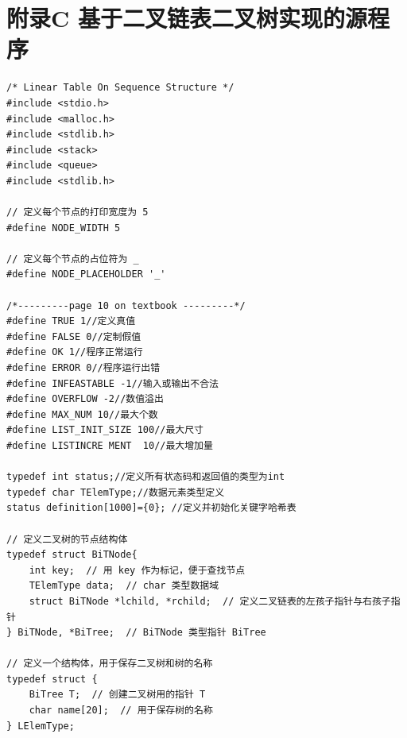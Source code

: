\documentclass[supercite]{Experimental_Report}
\theoremstyle{definition}
\begin{document}
\section{附录C 基于二叉链表二叉树实现的源程序}
\begin{lstlisting}[title =相关定义,frame=none]
/* Linear Table On Sequence Structure */
#include <stdio.h>
#include <malloc.h>
#include <stdlib.h>
#include <stack>
#include <queue>
#include <stdlib.h>

// 定义每个节点的打印宽度为 5
#define NODE_WIDTH 5

// 定义每个节点的占位符为 _
#define NODE_PLACEHOLDER '_'

/*---------page 10 on textbook ---------*/
#define TRUE 1//定义真值 
#define FALSE 0//定制假值 
#define OK 1//程序正常运行 
#define ERROR 0//程序运行出错 
#define INFEASTABLE -1//输入或输出不合法 
#define OVERFLOW -2//数值溢出 
#define MAX_NUM 10//最大个数 
#define LIST_INIT_SIZE 100//最大尺寸 
#define LISTINCRE MENT  10//最大增加量 

typedef int status;//定义所有状态码和返回值的类型为int
typedef char TElemType;//数据元素类型定义
status definition[1000]={0}; //定义并初始化关键字哈希表 

// 定义二叉树的节点结构体
typedef struct BiTNode{
	int key;  // 用 key 作为标记，便于查找节点
	TElemType data;  // char 类型数据域
	struct BiTNode *lchild, *rchild;  // 定义二叉链表的左孩子指针与右孩子指针
} BiTNode, *BiTree;  // BiTNode 类型指针 BiTree

// 定义一个结构体，用于保存二叉树和树的名称
typedef struct {
	BiTree T;  // 创建二叉树用的指针 T
	char name[20];  // 用于保存树的名称
} LElemType;


\end{lstlisting}
\end{document}
